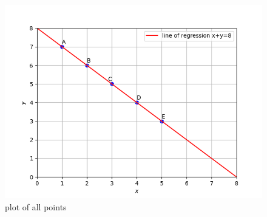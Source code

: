 \documentclass[journal,12pt,twocolumn]{IEEEtran}
\begin{document}
\begin{figure}[h!]
		\centering
	\includegraphics[width=\columnwidth]{./figs/fig1.png}
	\caption{plot of all points}
	\label{Fig1}
	\end{figure}
\end{document}
